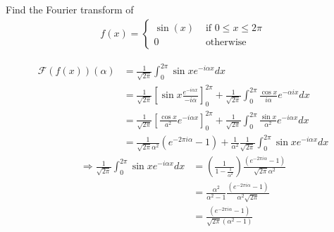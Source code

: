\documentclass[11pt]{article}
\begin{document}
\begin{exercise}
    Find the Fourier transform of 
    \begin{align*}
        f(x) = \left\{\begin{array}{ll}
                \sin(x) & \text{ if } 0 \leq x \leq 2 \pi 
                \\
                0 & \text{ otherwise }
               \end{array}
               \right.
    \end{align*}
\end{exercise}
\begin{solution} 
$$\begin{aligned} \mathcal{F}(f(x))(\alpha) & =\frac{1}{\sqrt{2 \pi}} \int_0^{2 \pi} \sin x e^{-i \alpha x} d x \\ & =\frac{1}{\sqrt{2 \pi}}\left[\sin x \frac{e^{-i \alpha x}}{-i \alpha}\right]_0^{2 \pi}+\frac{1}{\sqrt{2 \pi}} \int_0^{2 \pi} \frac{\cos x}{i \alpha} e^{-\alpha i x} d x \\ & =\frac{1}{\sqrt{2 \pi}}\left[\frac{\cos x}{a^2} e^{-i \alpha x}\right]_0^{2 \pi}+\frac{1}{\sqrt{2 \pi}} \int_0^{2 \pi} \frac{\sin x}{\alpha^2} e^{-i \alpha x} d x \\ & =\frac{1}{\sqrt{2 \pi} \alpha^2}\left(e^{-2 \pi i \alpha}-1\right)+\frac{1}{\alpha^2} \frac{1}{\sqrt{2 \pi}} \int_0^{2 \pi} \sin x e^{-i \alpha x} d x\end{aligned}$$
$$
\begin{aligned} \Rightarrow \frac{1}{\sqrt{2 \pi}} \int_0^{2 \pi} \sin x e^{-i \alpha x} d x & =\left(\frac{1}{1-\frac{1}{\alpha^2}}\right) \frac{\left(e^{-2 \pi i \alpha}-1\right)}{\sqrt{2 \pi} \alpha^2} \\ & =\frac{\alpha^2}{\alpha^2-1} \frac{\left(e^{-2 \pi i \alpha}-1\right)}{\alpha^2 \sqrt{2 \pi}} \\ & =\frac{\left(e^{-2 \pi i \alpha}-1\right)}{\sqrt{2 \pi}\left(\alpha^2-1\right)}\end{aligned}
$$
\end{solution}
\end{document}
